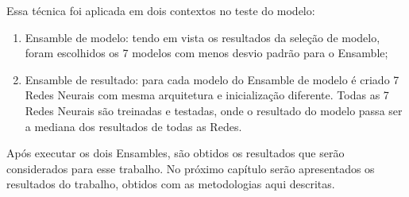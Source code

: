 Essa técnica foi aplicada em dois contextos no teste do modelo:

\begin{enumerate}
    \item Ensamble de modelo: tendo em vista os resultados da seleção de modelo, foram escolhidos os 7 modelos com menos desvio padrão para o Ensamble;
    \item Ensamble de resultado: para cada modelo do Ensamble de modelo é criado 7 Redes Neurais com mesma arquitetura e inicialização diferente. Todas as 7 Redes Neurais são treinadas e testadas, onde o resultado do modelo passa ser a mediana dos resultados de todas as Redes.
\end{enumerate}

Após executar os dois Ensambles, são obtidos os resultados que serão considerados para esse trabalho. No próximo capítulo serão apresentados os resultados do trabalho, obtidos com as metodologias aqui descritas.